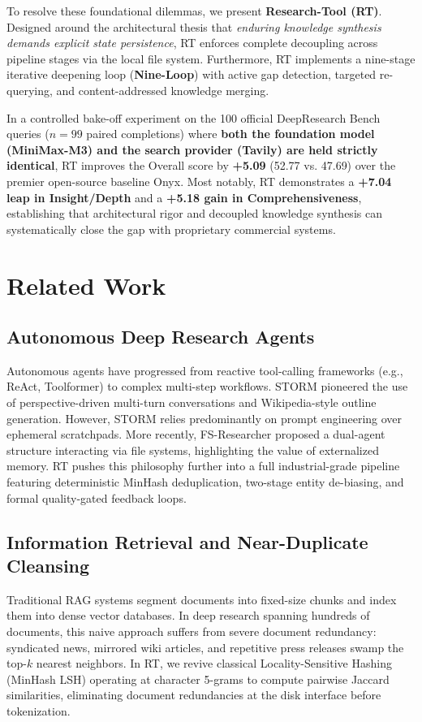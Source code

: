 \documentclass[11pt,a4paper]{article}
\begin{document}
To resolve these foundational dilemmas, we present \textbf{Research-Tool (RT)}. Designed around the architectural thesis that \textit{enduring knowledge synthesis demands explicit state persistence}, RT enforces complete decoupling across pipeline stages via the local file system. Furthermore, RT implements a nine-stage iterative deepening loop (\textbf{Nine-Loop}) with active gap detection, targeted re-querying, and content-addressed knowledge merging.

In a controlled bake-off experiment on the 100 official DeepResearch Bench queries ($n=99$ paired completions) where \textbf{both the foundation model (MiniMax-M3) and the search provider (Tavily) are held strictly identical}, RT improves the Overall score by \textbf{+5.09} (52.77 vs. 47.69) over the premier open-source baseline Onyx. Most notably, RT demonstrates a \textbf{+7.04 leap in Insight/Depth} and a \textbf{+5.18 gain in Comprehensiveness}, establishing that architectural rigor and decoupled knowledge synthesis can systematically close the gap with proprietary commercial systems.

\section{Related Work}

\subsection{Autonomous Deep Research Agents}
Autonomous agents have progressed from reactive tool-calling frameworks (e.g., ReAct, Toolformer) to complex multi-step workflows. STORM \cite{shao2024storm} pioneered the use of perspective-driven multi-turn conversations and Wikipedia-style outline generation. However, STORM relies predominantly on prompt engineering over ephemeral scratchpads. More recently, FS-Researcher \cite{fsresearcher2026} proposed a dual-agent structure interacting via file systems, highlighting the value of externalized memory. RT pushes this philosophy further into a full industrial-grade pipeline featuring deterministic MinHash deduplication, two-stage entity de-biasing, and formal quality-gated feedback loops.

\subsection{Information Retrieval and Near-Duplicate Cleansing}
Traditional RAG systems segment documents into fixed-size chunks and index them into dense vector databases. In deep research spanning hundreds of documents, this naive approach suffers from severe document redundancy: syndicated news, mirrored wiki articles, and repetitive press releases swamp the top-$k$ nearest neighbors. In RT, we revive classical Locality-Sensitive Hashing (MinHash LSH) \cite{broder1997minhash} operating at character 5-grams to compute pairwise Jaccard similarities, eliminating document redundancies at the disk interface before tokenization.
\end{document}
